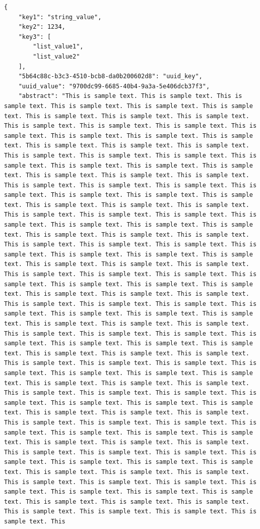 \documentclass[11pt,a4paper]{article}
\begin{document}
\begin{verbatim}
{
    "key1": "string_value",
    "key2": 1234,
    "key3": [
        "list_value1",
        "list_value2"
    ],
    "5b64c88c-b3c3-4510-bcb8-da0b200602d8": "uuid_key",
    "uuid_value": "9700dc99-6685-40b4-9a3a-5e406dcb37f3",
    "abstract": "This is sample text. This is sample text. This is sample text. This is sample text. This is sample text. This is sample text. This is sample text. This is sample text. This is sample text. This is sample text. This is sample text. This is sample text. This is sample text. This is sample text. This is sample text. This is sample text. This is sample text. This is sample text. This is sample text. This is sample text. This is sample text. This is sample text. This is sample text. This is sample text. This is sample text. This is sample text. This is sample text. This is sample text. This is sample text. This is sample text. This is sample text. This is sample text. This is sample text. This is sample text. This is sample text. This is sample text. This is sample text. This is sample text. This is sample text. This is sample text. This is sample text. This is sample text. This is sample text. This is sample text. This is sample text. This is sample text. This is sample text. This is sample text. This is sample text. This is sample text. This is sample text. This is sample text. This is sample text. This is sample text. This is sample text. This is sample text. This is sample text. This is sample text. This is sample text. This is sample text. This is sample text. This is sample text. This is sample text. This is sample text. This is sample text. This is sample text. This is sample text. This is sample text. This is sample text. This is sample text. This is sample text. This is sample text. This is sample text. This is sample text. This is sample text. This is sample text. This is sample text. This is sample text. This is sample text. This is sample text. This is sample text. This is sample text. This is sample text. This is sample text. This is sample text. This is sample text. This is sample text. This is sample text. This is sample text. This is sample text. This is sample text. This is sample text. This is sample text. This is sample text. This is sample text. This is sample text. This is sample text. This is sample text. This is sample text. This is sample text. This is sample text. This is sample text. This is sample text. This is sample text. This is sample text. This is sample text. This is sample text. This is sample text. This is sample text. This is sample text. This is sample text. This is sample text. This is sample text. This is sample text. This is sample text. This is sample text. This is sample text. This is sample text. This is sample text. This is sample text. This is sample text. This is sample text. This is sample text. This is sample text. This is sample text. This is sample text. This is sample text. This is sample text. This is sample text. This is sample text. This is sample text. This is sample text. This is sample text. This is sample text. This is sample text. This is sample text. This is sample text. This is sample text. This is sample text. This is sample text. This is sample text. This is sample text. This is sample text. This 
\end{verbatim}
\end{document}
